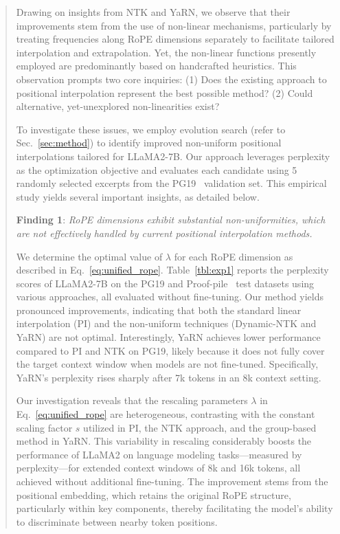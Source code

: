 \begin{abstract}
Drawing on insights from NTK and YaRN, we observe that their improvements stem from the use of non-linear mechanisms, particularly by treating frequencies along RoPE dimensions separately to facilitate tailored interpolation and extrapolation. Yet, the non-linear functions presently employed are predominantly based on handcrafted heuristics. This observation prompts two core inquiries: (1) Does the existing approach to positional interpolation represent the best possible method? (2) Could alternative, yet-unexplored non-linearities exist?

To investigate these issues, we employ evolution search (refer to Sec.~\ref{sec:method}) to identify improved non-uniform positional interpolations tailored for LLaMA2-7B. Our approach leverages perplexity as the optimization objective and evaluates each candidate using 5 randomly selected excerpts from the PG19~\cite{pg19} validation set. This empirical study yields several important insights, as detailed below.

\textbf{Finding 1}: \textit{RoPE dimensions exhibit substantial non-uniformities, which are not effectively handled by current positional interpolation methods.}

We determine the optimal value of $\lambda$ for each RoPE dimension as described in Eq.~\ref{eq:unified_rope}. Table~\ref{tbl:exp1} reports the perplexity scores of LLaMA2-7B on the PG19 and Proof-pile~\cite{proof-pile} test datasets using various approaches, all evaluated without fine-tuning. Our method yields pronounced improvements, indicating that both the standard linear interpolation (PI) and the non-uniform techniques (Dynamic-NTK and YaRN) are not optimal. Interestingly, YaRN achieves lower performance compared to PI and NTK on PG19, likely because it does not fully cover the target context window when models are not fine-tuned. Specifically, YaRN's perplexity rises sharply after 7k tokens in an 8k context setting.

Our investigation reveals that the rescaling parameters $\lambda$ in Eq.~\ref{eq:unified_rope} are heterogeneous, contrasting with the constant scaling factor $s$ utilized in PI, the NTK approach, and the group-based method in YaRN. This variability in rescaling considerably boosts the performance of LLaMA2 on language modeling tasks—measured by perplexity—for extended context windows of 8k and 16k tokens, all achieved without additional fine-tuning. The improvement stems from the positional embedding, which retains the original RoPE structure, particularly within key components, thereby facilitating the model's ability to discriminate between nearby token positions.


\end{abstract}
